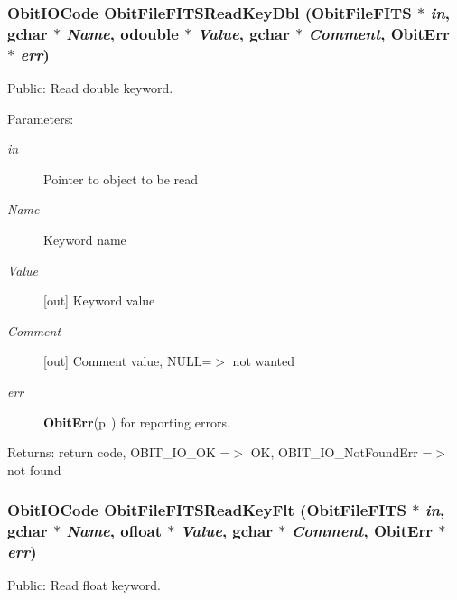 \subsubsection{\setlength{\rightskip}{0pt plus 5cm}Obit\-IOCode Obit\-File\-FITSRead\-Key\-Dbl ({\bf Obit\-File\-FITS} $\ast$ {\em in}, gchar $\ast$ {\em Name}, {\bf odouble} $\ast$ {\em Value}, gchar $\ast$ {\em Comment}, {\bf Obit\-Err} $\ast$ {\em err})}\label{ObitFileFITS_8c_a19}


Public: Read double keyword. 

\begin{Desc}
\item[Parameters:]
\begin{description}
\item[{\em in}]Pointer to object to be read \item[{\em Name}]Keyword name \item[{\em Value}][out] Keyword value \item[{\em Comment}][out] Comment value, NULL=$>$ not wanted \item[{\em err}]{\bf Obit\-Err}{\rm (p.\,\pageref{structObitErr})} for reporting errors. \end{description}
\end{Desc}
\begin{Desc}
\item[Returns:]return code, OBIT\_\-IO\_\-OK =$>$ OK, OBIT\_\-IO\_\-Not\-Found\-Err =$>$ not found \end{Desc}
\subsubsection{\setlength{\rightskip}{0pt plus 5cm}Obit\-IOCode Obit\-File\-FITSRead\-Key\-Flt ({\bf Obit\-File\-FITS} $\ast$ {\em in}, gchar $\ast$ {\em Name}, {\bf ofloat} $\ast$ {\em Value}, gchar $\ast$ {\em Comment}, {\bf Obit\-Err} $\ast$ {\em err})}\label{ObitFileFITS_8c_a18}


Public: Read float keyword. 

